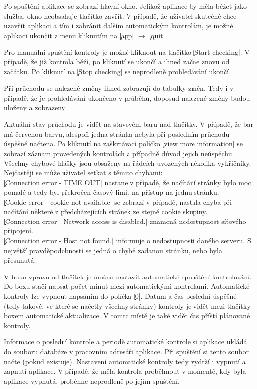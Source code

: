 Po spuštění aplikace se zobrazí hlavní okno.
Jelikož aplikace by měla běžet jako služba, okno neobsahuje tlačítko zavřít.
V případě, že uživatel skutečné chce uzavřít aplikaci a tím i zabránit dalším automatickým kontrolám, je možné aplikaci ukončit z menu kliknutím na \c|app| $\rightarrow$ \c|quit|.

Pro manuální spuštění kontroly je možné kliknout na tlačítko \c|Start checking|.
V případě, že již kontrola běží, po kliknutí se ukončí a ihned začne znovu od začátku.
Po kliknutí na \c|Stop checking| se neprodleně prohledávání ukončí.

Při průchodu se nalezené změny ihned zobrazují do tabulky změn.
Tedy i v případě, že je prohledávání ukončeno v průběhu, doposud nalezené změny budou uloženy a zobrazeny.

Aktuální stav průchodu je vidět na stavovém baru  nad tlačítky.
V případě, že bar má červenou barvu, alespoň jedna stránka nebyla při posledním průchodu úspěšně načtena.
Po kliknutí na zaškrtávací políčko \c|view more information| se zobrazí záznam provedených kontrolách a případně důvod jejich neúspěchu.
Všechny chybové hlášky jsou obsaženy na řádcích uvozených několika vykřičníky.
Nejčastěji se může uživatel setkat s těmito chybami:\\
\c|Connection error - TIME OUT| nastane v případě, že načítání stránky bylo moc pomalé a tedy byl překročen časový limit na přístup na jednu stránku.\\ %
\c|Cookie error - cookie not available| se zobrazí v případě, nastala chyba při načítání některé z předcházejících stránek ze stejné cookie skupiny.\\
\c|Connection error - Network access is disabled.| znamená nedostupnost síťového připojení.\\
\c|Connection error - Host not found.| informuje o nedostupnosti daného serveru. S největší pravděpodobností se  jedná o chybě zadanou stránku, nebo byla přesunutá.

V boxu vpravo od tlačítek je možno nastavit automatické spouštění kontrolování.
Do boxu stačí napsat počet minut mezi automatickými kontrolami.
Automatické kontroly lze vypnout napsáním do políčka \c|0|.
Datum a čas poslední úspěšné (tedy takové, ve které se načetly všechny stránky) kontroly je vidět mezi tlačítky boxem automatické aktualizace.
V tomto místě je také vidět čas příští plánované kontroly.

Informace o poslední kontrole a periodě automatické kontrole si aplikace ukládá do souboru databáze v pracovním adresáři aplikace.
Při spuštění si tento soubor načte (pokud existuje).
Nastavení automatické kontroly tedy vydrží i vypnutí a zapnutí aplikace.
V případě, že měla kontrola proběhnout v momentě, kdy byla aplikace vypnutá, proběhne neprodleně po jejím spuštění.

